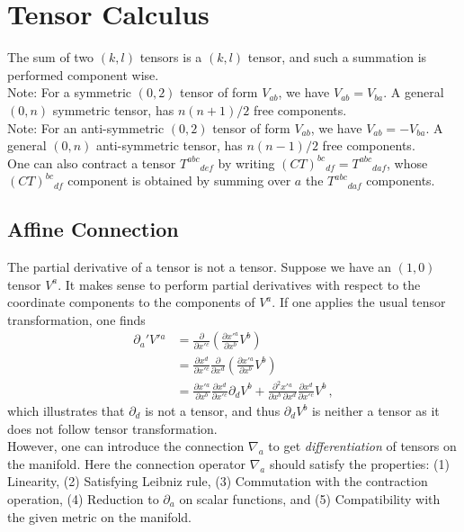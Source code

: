 \documentclass[11pt, onesided]{book}
\theoremstyle{break}
\theoremstyle{break}
\newcommand{\pd}{\partial}
\newcommand{\note}{\color{red}Note: \color{black}}
\begin{document}
\section[Tensor Calculus]{\color{red} Tensor Calculus\color{black}}
The sum of two $(k,l)$ tensors is a $(k,l)$ tensor, and such a summation is performed component wise.\\

\note For a symmetric $(0,2)$ tensor of form $V_{ab}$, we have $V_{ab} = V_{ba}$. A general $(0,n)$ symmetric tensor, has $n(n+1)/2$ free components. \\

\note For an anti-symmetric $(0,2)$ tensor of form $V_{ab}$, we have $V_{ab} = -V_{ba}$. A general $(0,n)$ anti-symmetric tensor, has $n(n-1)/2$ free components. \\

One can also contract a tensor $T^{abc}{}_{def}$ by writing $(CT)^{bc}{}_{df}=T^{abc}{}_{daf}$, whose $(CT)^{bc}{}_{df}$ component is obtained by summing over $a$ the $T^{abc}{}_{daf}$ components. \\


\subsection{Affine Connection}
The partial derivative of a tensor is not a tensor. Suppose we have an $(1,0)$ tensor $V^a$. It makes sense to perform partial derivatives with respect to the coordinate components to the components of $V^a$. If one applies the usual tensor transformation, one finds
\begin{align*}
\pd_a' V'{}^a 
&= \frac{\pd}{\pd x'{}^c}\left( \frac{\pd x'{}^a}{\pd x^b} V^b\right) \\
&= \frac{\pd x^d}{\pd x'{}^c} \frac{\pd}{\pd x^d}\left( \frac{\pd x'{}^a}{\pd x^b}V^b \right)\\
&= \frac{\pd x'{}^a}{\pd x^b}\frac{\pd x^d}{\pd x'{}^c}\pd_d V^b + \frac{\pd^2 x'{}^a}{\pd x^b \, \pd x^d} \frac{\pd x^d}{\pd x'{}^c}V^b\,,
\end{align*}
which illustrates that $\pd_d$ is not a tensor, and thus $\pd_dV^b$ is neither a tensor as it does not follow tensor transformation.\\

However, one can introduce the connection $\nabla_a$ to get \textit{differentiation} of tensors on the manifold. Here the connection operator $\nabla_a$ should satisfy the properties: (1) Linearity, (2) Satisfying Leibniz rule, (3) Commutation with the contraction operation, (4) Reduction to $\pd_a$ on scalar functions, and (5) Compatibility with the given metric on the manifold.\\
\end{document}
